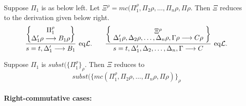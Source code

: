\documentclass[preprint]{elsarticle}
\newcommand{\Seq}[2]{#1\longrightarrow #2}
\newcommand{\circL}{\circ{\cal L}}
\newcommand{\eqL}{{\rm eq}{\cal L}}
\begin{document}
\begin{trivlist}
\item[\fbox{$\eqL/\circL$}] Suppose $\Pi_1$ is as below left. 
  Let $\Xi^\rho = mc(\Pi_1^\rho, \Pi_2\rho,\ldots,\Pi_n\rho, \Pi\rho$.
  Then $\Xi$ reduces to the derivation given below right. 
  \begin{displaymath}
    \infer[\eqL .]{\Seq{s=t,\Delta_1'}{B_1}}
    {\left\{\raisebox{-1.5ex}
        {\deduce{\Seq{\Delta_1'\rho}{B_1\rho}}
          {\Pi_1^{\rho}}}
      \right\}}
    \qquad
    \infer[\eqL .]
        {\Seq{s=t,\Delta_1',\Delta_2,\ldots,\Delta_n,\Gamma}{C}}
        {
          \left\{
          \raisebox{-1.3ex}{
          \deduce{\Seq{\Delta_1'\rho,\Delta_2\rho,\ldots,\Delta_n\rho,\Gamma\rho}{C\rho}}{\Xi^\rho}
          }
          \right\}
        }
  \end{displaymath}



\item[\fbox{$subst/\circL$}] Suppose $\Pi_1$ is $subst(\{\Pi_1^\rho\}_\rho$.
Then $\Xi$ reduces to $$subst(\{mc(\Pi_1^\rho,\Pi_2\rho,\ldots,\Pi_n\rho,\Pi\rho)\}_\rho$$


\end{trivlist}

\paragraph{Right-commutative cases:}
\end{document}
